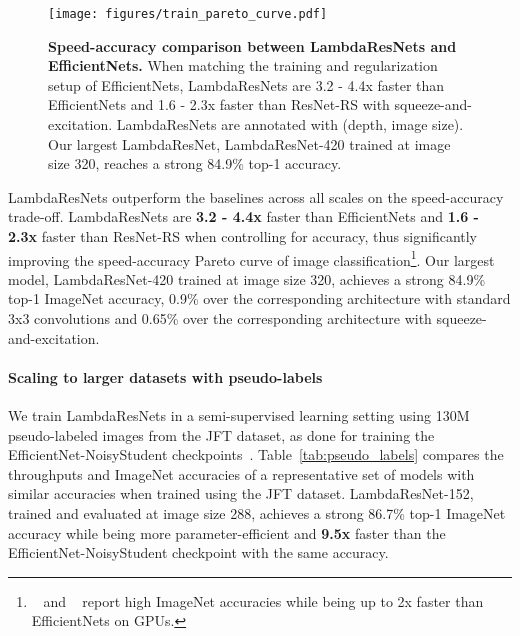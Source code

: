 \documentclass{article} \usepackage{iclr2021_conference,times}
\begin{document}
\begin{figure}[ht]
    \begin{center}
    \texttt{[image: figures/train\_pareto\_curve.pdf]}
    \end{center}
    \caption{
    \textbf{Speed-accuracy comparison between LambdaResNets and EfficientNets.}
    When matching the training and regularization setup of EfficientNets, LambdaResNets are 3.2 - 4.4x faster than EfficientNets and 1.6 - 2.3x faster than ResNet-RS with squeeze-and-excitation. 
    LambdaResNets are annotated with (depth, image size). 
    Our largest LambdaResNet, LambdaResNet-420 trained at image size 320, reaches a strong 84.9\% top-1 accuracy.
    }
    \label{fig:supervised_pareto_curve}
    \vspace{-0.2cm}
\end{figure}

LambdaResNets outperform the baselines across all scales on the speed-accuracy trade-off.
LambdaResNets are \textbf{3.2 - 4.4x} faster than EfficientNets and \textbf{1.6 - 2.3x} faster than ResNet-RS when controlling for accuracy, thus significantly improving the speed-accuracy Pareto curve of image classification\footnote{~\cite{ridnik2020tresnet} and ~\cite{zhang2020resnest} report high ImageNet accuracies while being up to 2x faster than EfficientNets on GPUs.}.
Our largest model, LambdaResNet-420 trained at image size 320, achieves a strong 84.9\% top-1 ImageNet accuracy, 
0.9\% over the corresponding architecture with standard 3x3 convolutions and
0.65\% over the corresponding architecture with squeeze-and-excitation.

\vspace{-0.1cm}
\paragraph{Scaling to larger datasets with pseudo-labels}
We train LambdaResNets in a semi-supervised learning setting using 130M pseudo-labeled images from the JFT dataset, as done for training the EfficientNet-NoisyStudent checkpoints~\citep{xie2020selftraining}.
Table~\ref{tab:pseudo_labels} compares the throughputs and ImageNet accuracies of 
a representative set of models with similar accuracies when trained using the JFT dataset.
LambdaResNet-152, trained and evaluated at image size 288, achieves a strong 86.7\% top-1 ImageNet accuracy while being more parameter-efficient and \textbf{9.5x} faster than the EfficientNet-NoisyStudent checkpoint with the same accuracy.
\end{document}
